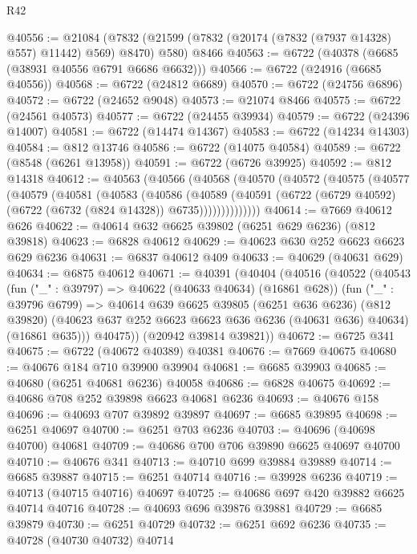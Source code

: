 \begin{lexlean}{R42}
\begin{coremodule}
{@40556 := @21084
    (@7832 (@21599 (@7832 (@20174 (@7832 (@7937 @14328) @557) @11442) @569) @8470) @580)
    @8466
@40563 := @6722 (@40378 (@6685 (@38931 @40556 @6791 @6686 @6632)))
@40566 := @6722 (@24916 (@6685 @40556))
@40568 := @6722 (@24812 @6689)
@40570 := @6722 (@24756 @6896)
@40572 := @6722 (@24652 @9048)
@40573 := @21074 @8466
@40575 := @6722 (@24561 @40573)
@40577 := @6722 (@24455 @39934)
@40579 := @6722 (@24396 @14007)
@40581 := @6722 (@14474 @14367)
@40583 := @6722 (@14234 @14303)
@40584 := @812 @13746
@40586 := @6722 (@14075 @40584)
@40589 := @6722 (@8548 (@6261 @13958))
@40591 := @6722 (@6726 @39925)
@40592 := @812 @14318
@40612 := @40563
    (@40566
      (@40568
        (@40570
          (@40572
            (@40575
              (@40577
                (@40579
                  (@40581
                    (@40583
                      (@40586
                        (@40589
                          (@40591
                            (@6722 (@6729 @40592) (@6722 (@6732 (@824 @14328)) @6735))))))))))))))
@40614 := @7669 @40612 @626
@40622 := @40614 @632 @6625 @39802 (@6251 @629 @6236) (@812 @39818)
@40623 := @6828 @40612
@40629 := @40623 @630 @252 @6623 @6623 @629 @6236
@40631 := @6837 @40612 @409
@40633 := @40629 (@40631 @629)
@40634 := @6875 @40612
@40671 := @40391
    (@40404
      (@40516
        (@40522
          (@40543
            (fun ("_" : @39797) => @40622 (@40633 @40634) (@16861 @628))
            (fun ("_" : @39796 @6799) =>
            @40614
              @639
              @6625
              @39805
              (@6251 @636 @6236)
              (@812 @39820)
              (@40623 @637 @252 @6623 @6623 @636 @6236 (@40631 @636) @40634)
              (@16861 @635)))
          @40475))
      (@20942 @39814 @39821))
@40672 := @6725 @341
@40675 := @6722 (@40672 @40389) @40381
@40676 := @7669 @40675
@40680 := @40676 @184 @710 @39900 @39904
@40681 := @6685 @39903
@40685 := @40680 (@6251 @40681 @6236) @40058
@40686 := @6828 @40675
@40692 := @40686 @708 @252 @39898 @6623 @40681 @6236
@40693 := @40676 @158
@40696 := @40693 @707 @39892 @39897
@40697 := @6685 @39895
@40698 := @6251 @40697
@40700 := @6251 @703 @6236
@40703 := @40696 (@40698 @40700) @40681
@40709 := @40686 @700 @706 @39890 @6625 @40697 @40700
@40710 := @40676 @341
@40713 := @40710 @699 @39884 @39889
@40714 := @6685 @39887
@40715 := @6251 @40714
@40716 := @39928 @6236
@40719 := @40713 (@40715 @40716) @40697
@40725 := @40686 @697 @420 @39882 @6625 @40714 @40716
@40728 := @40693 @696 @39876 @39881
@40729 := @6685 @39879
@40730 := @6251 @40729
@40732 := @6251 @692 @6236
@40735 := @40728 (@40730 @40732) @40714
}
\end{coremodule}
\end{lexlean}

